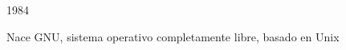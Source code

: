\documentclass[hyperref={colorlinks}]{beamer}
\begin{document}
\begin{frame}
\begin{minipage}{.55\linewidth}
\begin{block}{1984}
\begin{minipage}{.2\linewidth}
        \end{minipage}
        \begin{minipage}{.75\linewidth}
        Nace GNU, sistema operativo completamente libre, basado en Unix
        \end{minipage}
    \end{block}
    \end{minipage}
\end{frame}
\end{document}
